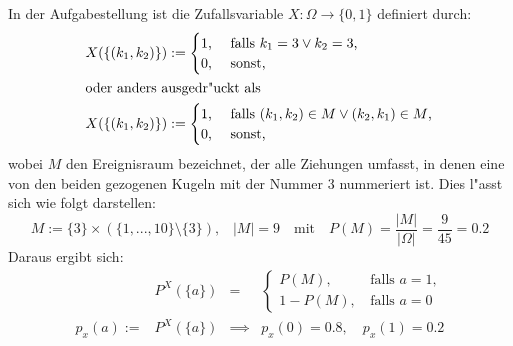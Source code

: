\begin{enumerate}[(a)]
        In der Aufgabestellung ist die Zufallsvariable $X: \Omega \rightarrow \{0, 1\}$ definiert durch:
        \begin{align*}
            X(\{(k_1, k_2)\}) &:= \begin{cases}
                1\text{,}& \text{ falls } k_1 = 3 \lor k_2 = 3\text{,} \\
                0\text{,}& \text{ sonst, }
            \end{cases}  \\
            \intertext{oder anders ausgedr"uckt als}
            X(\{(k_1, k_2)\}) &:= \begin{cases}
                1\text{,}& \text{ falls } (k_1, k_2) \in M \lor (k_2, k_1) \in M\text{,} \\
                0\text{,}& \text{ sonst, }
            \end{cases}
        \end{align*}
        wobei $M$ den Ereignisraum bezeichnet, der alle Ziehungen umfasst, in
        denen eine von den beiden gezogenen Kugeln mit der Nummer 3 nummeriert
        ist. Dies l"asst sich wie folgt darstellen:
        \begin{equation*}
            M := \{3\} \times (\{1,...,10\} \setminus \{3\})\text{,} \quad |M| = 9 \quad \text{mit} \quad P(M) = \dfrac{|M|}{|\Omega|} = \dfrac{9}{45} = 0.2
        \end{equation*}
        Daraus ergibt sich:
        \begin{equation*}
            \begin{array}{rccl}
                &P^X(\{a\}) &=& \begin{cases}
                    P(M)\text{,}& \text{ falls } a = 1, \\
                    1 - P(M)\text{,}& \text{ falls } a = 0
                \end{cases} \\[20pt]
                p_x(a) := &P^X(\{a\}) &\implies& p_x(0) = 0.8, \quad p_x(1) = 0.2
            \end{array}
        \end{equation*}
\end{enumerate}
